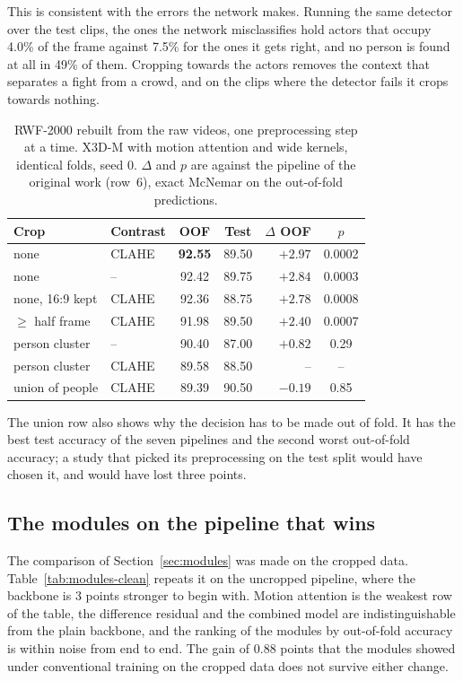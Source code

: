 \documentclass[conference]{IEEEtran}
\begin{document}
This is consistent with the errors the network makes. Running the same
detector over the test clips, the ones the network misclassifies hold
actors that occupy 4.0\% of the frame against 7.5\% for the ones it gets
right, and no person is found at all in 49\% of them. Cropping towards the actors
removes the context that separates a fight from a crowd, and on the clips
where the detector fails it crops towards nothing.

\begin{table}[t]
  \centering
  \caption{RWF-2000 rebuilt from the raw videos, one preprocessing step at
  a time. X3D-M with motion attention and wide kernels, identical folds,
  seed 0. $\Delta$ and $p$ are against the pipeline of the original work
  (row~6), exact McNemar on the out-of-fold predictions.}
  \label{tab:pipeline}
  \setlength{\tabcolsep}{3pt}
  \begin{tabular}{llccrc}
    \toprule
    Crop & Contrast & OOF & Test & $\Delta$ OOF & $p$ \\
    \midrule
    none            & CLAHE & \textbf{92.55} & 89.50 & $+2.97$ & 0.0002 \\
    none            & --    & 92.42 & 89.75 & $+2.84$ & 0.0003 \\
    none, 16:9 kept & CLAHE & 92.36 & 88.75 & $+2.78$ & 0.0008 \\
    $\geq$ half frame & CLAHE & 91.98 & 89.50 & $+2.40$ & 0.0007 \\
    person cluster  & --    & 90.40 & 87.00 & $+0.82$ & 0.29 \\
    person cluster  & CLAHE & 89.58 & 88.50 & --      & --   \\
    union of people & CLAHE & 89.39 & 90.50 & $-0.19$ & 0.85 \\
    \bottomrule
  \end{tabular}
\end{table}

The union row also shows why the decision has to be made out of fold. It
has the best test accuracy of the seven pipelines and the second worst
out-of-fold accuracy; a study that picked its preprocessing on the test
split would have chosen it, and would have lost three points.

\subsection{The modules on the pipeline that wins}
\label{sec:modules-clean}

The comparison of Section~\ref{sec:modules} was made on the cropped data.
Table~\ref{tab:modules-clean} repeats it on the uncropped pipeline, where
the backbone is 3 points stronger to begin with. Motion attention is the
weakest row of the table, the difference residual and the combined model
are indistinguishable from the plain backbone, and the ranking of the
modules by out-of-fold accuracy is within noise from end to end. The gain
of 0.88 points that the modules showed under conventional training on the
cropped data does not survive either change.
\end{document}
